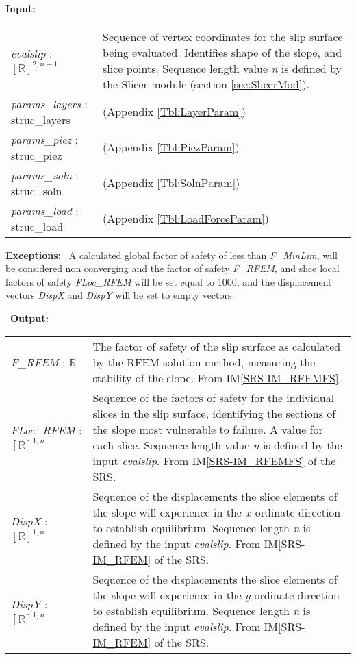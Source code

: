 \documentclass[12pt, titlepage]{article}
\begin{document}
\textbf{Input:}
\renewcommand*{\arraystretch}{1.5}
\begin{longtable} {p{} p{}}
  \textit{evalslip} : $[\mathbb{R}]^{2,n+1}$ & Sequence of vertex
  coordinates for the slip surface being evaluated. Identifies shape
  of the slope, and slice points. Sequence length value \textit{n} is
  defined by the Slicer module (section \ref{sec:SlicerMod}). \\

  \textit{params\_layers} : struc\_layers & (Appendix
  \ref{Tbl:LayerParam})\\

  \textit{params\_piez} : struc\_piez & (Appendix
  \ref{Tbl:PiezParam})\\

  \textit{params\_soln} : struc\_soln & (Appendix
  \ref{Tbl:SolnParam})\\

  \textit{params\_load} : struc\_load & (Appendix
  \ref{Tbl:LoadForceParam})
\end{longtable}

\noindent \textbf{Exceptions:} ~\newline\noindent A
calculated global factor of safety of less than \textit{F\_MinLim}, will be
considered non converging and the factor of safety \textit{F\_RFEM},
and slice local factors of safety \textit{FLoc\_RFEM} will be set
equal to 1000, and the displacement vectors \textit{DispX} and
\textit{DispY} will be set to empty vectors.

~\newline\noindent \textbf{Output:}
\renewcommand*{\arraystretch}{1.5}
\begin{longtable}{p{} p{}}
  \textit{F\_RFEM} : $\mathbb{R}$ & The factor of safety of the slip
  surface as calculated by the RFEM solution method, measuring the
  stability of the slope. From IM\ref{SRS-IM_RFEMFS}.\\

  \textit{FLoc\_RFEM} : $[\mathbb{R}]^{1,n}$ & Sequence of the factors
  of safety for the individual slices in the slip surface, identifying
  the sections of the slope most vulnerable to failure. A value for
  each slice. Sequence length value \textit{n} is defined by the input
  \textit{evalslip}. From IM\ref{SRS-IM_RFEMFS} of the SRS.\\

  \textit{DispX} : $[\mathbb{R}]^{1,n}$ & Sequence of the
  displacements the slice elements of the slope will experience in the
  $x$-ordinate direction to establish equilibrium. Sequence length
  \textit{n} is defined by the input \textit{evalslip}. From
  IM\ref{SRS-IM_RFEM} of the SRS.\\

  \textit{DispY} : $[\mathbb{R}]^{1,n}$ & Sequence of the
  displacements the slice elements of the slope will experience in the
  $y$-ordinate direction to establish equilibrium. Sequence length
  \textit{n} is defined by the input \textit{evalslip}. From
  IM\ref{SRS-IM_RFEM} of the SRS.
\end{longtable}
\end{document}

